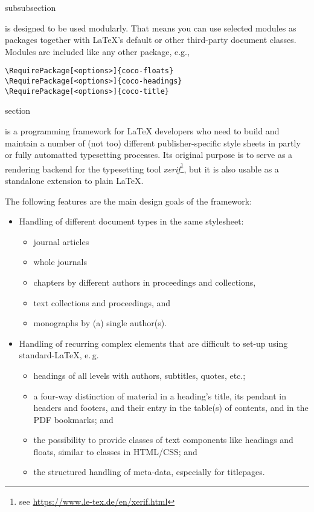 \begin{Heading}[label=sec:modules]{subsubsection}
\end{Heading}

{\CoCoTeX} is designed to be used modularly. That means you can use
selected modules as packages together with \LaTeX's default or other
third-party document classes. Modules are included like any other
package, e.g.,
\begin{lstlisting}[style=tex]
\RequirePackage[<options>]{coco-floats}
\RequirePackage[<options>]{coco-headings}
\RequirePackage[<options>]{coco-title}
\end{lstlisting}

\begin{Heading}{section}
\end{Heading}

{\CoCoTeX} is a programming framework for {\LaTeX} developers who need
to build and maintain a number of (not too) different
publisher-specific style sheets in partly or fully automatted
typesetting processes. Its original purpose is to serve as a rendering
backend for the typesetting tool \textit{xerif}\footnote{see
  \url{https://www.le-tex.de/en/xerif.html}}, but it is also usable as
a standalone extension to plain {\LaTeX}.

The following features are the main design goals of the {\CoCoTeX}
framework:
\begin{itemize}
\item Handling of different document types in the same stylesheet:
  \begin{itemize}
  \item journal articles
  \item whole journals
  \item chapters by different authors in proceedings and collections,
  \item text collections and proceedings, and
  \item monographs by (a) single author(s).
  \end{itemize}
\item Handling of recurring complex elements that are difficult to
  set-up using standard-\LaTeX, e.\,g.
  \begin{itemize}
  \item headings of all levels with authors, subtitles, quotes, etc.;
  \item a four-way distinction of material in a heading's title, its
    pendant in headers and footers, and their entry in the table(s) of
    contents, and in the PDF bookmarks; and
  \item the possibility to provide classes of text components like
    headings and floats, similar to classes in HTML/CSS; and
  \item the structured handling of meta-data, especially for
    titlepages.
  \end{itemize}
\end{itemize}

